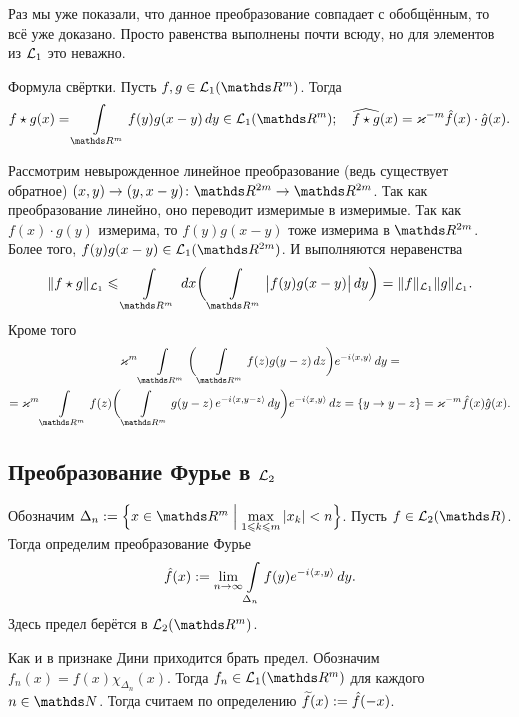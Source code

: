 Раз мы уже показали, что данное преобразование совпадает с обобщённым, то всё уже доказано. Просто равенства выполнены почти всюду, но для элементов из $\mathcal L_1$ это неважно.

\begin{Ut}
  Формула свёртки. Пусть $f,g\in\L_1(\R^m)$. Тогда
\[
  f\star g(x) = \Gint{\R^m} f(y)g(x-y)\,dy\in\L_1(\R^m);\quad
  \widehat{f\star g}(x) = \k^{-m} \hat f(x)\cdot \hat g(x).
\]
\end{Ut}
\begin{Proof}
 Рассмотрим невырожденное линейное преобразование (ведь существует обратное) $(x,y)\to(y,x-y)\colon \R^{2m}\to\R^{2m}$. Так как преобразование линейно, оно переводит измеримые в измеримые. Так как $f(x)\cdot g(y)$  измерима, то $f(y)g(x-y)$ тоже измерима в $\R^{2m}$. Более того, $f(y)g(x-y)\in\L_1(\R^{2m})$. И выполняются неравенства
\[
  \|f\star g\|_{\L_1}\le \Gint{\R^m}\,dx\bigg(\Gint{\R^m}\big|f(y)g(x-y)\big|\,dy\bigg) = \|f\|_{\L_1}\|g\|_{\L_1}.
\]
Кроме того
\begin{multline*}
  \k^m\Gint{\R^m}\bigg(\Gint{\R^m}f(z)g(y-z)\,dz\bigg)e^{-i\la x,y\ra}\,dy=\\=
  \k^m\Gint{\R^m} f(z)\bigg(\Gint{\R^m}g(y-z)\,e^{-i\la x,y-z\ra}\,dy\bigg) e^{-i\la x,y\ra}\,dz = \{ y\to y-z\} =\k^{-m}\hat f(x)\hat g(x).
\end{multline*}
\end{Proof}
\subsection{Преобразование Фурье в $\mathcal L_2$}
\begin{Def}
 Обозначим $\Delta_n:=\Big\{ x\in\R^m\Bigm|\max\limits_{1\le k\le m}|x_k|<n\Big\}$. Пусть $f\in\L_2(\R)$. Тогда определим преобразование Фурье
\[
  \hat f(x):=\lim\limits_{n\rightarrow\infty} \int\limits_{\Delta_n} f(y) e^{-i\langle x,y\rangle}\,dy.
\]
Здесь предел берётся в $\L_2(\R^m)$.
\end{Def}
Как и в признаке Дини приходится брать предел. Обозначим $f_n(x) = f(x)\chi_{\Delta_n}(x)$. Тогда $f_n\in\L_1(\R^m)$ для каждого $n\in\N$. Тогда считаем по определению $\widetilde{f}{}(x) := \hat f(-x)$.

